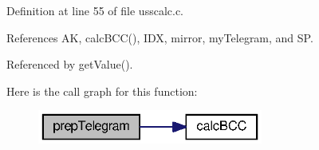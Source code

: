 Definition at line 55 of file usscalc.\+c.



References A\+K, calc\+B\+C\+C(), I\+D\+X, mirror, my\+Telegram, and S\+P.



Referenced by get\+Value().



Here is the call graph for this function\+:\nopagebreak
\begin{figure}[H]
\begin{center}
\leavevmode
\includegraphics[width=210pt]{usscalc_8c_ac734b72553a80042ac173bfebf6b5185_cgraph}
\end{center}
\end{figure}


